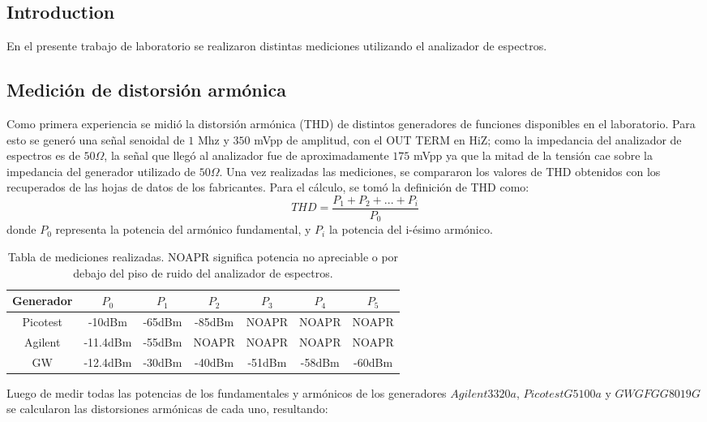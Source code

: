 \subsection{Introduction}

En el presente trabajo de laboratorio se realizaron distintas mediciones utilizando el analizador de espectros.

\subsection{Medición de distorsión armónica}
Como primera experiencia se midió la distorsión armónica (THD) de distintos generadores de funciones disponibles en el laboratorio. Para esto se generó una señal senoidal de $1$ Mhz y $350$ mVpp de amplitud, con el OUT TERM en HiZ; como la impedancia del analizador de espectros es de $50 \Omega$, la señal que llegó al analizador fue de aproximadamente $175$ mVpp ya que la mitad de la tensión cae sobre la impedancia del generador utilizado de $50 \Omega$. Una vez realizadas las mediciones, se compararon los valores de THD obtenidos con los recuperados de las hojas de datos de los fabricantes. Para el cálculo, se tomó la definición de THD como:
\begin{equation}
    THD=\frac{P_1+P_2+...+P_i}{P_0}
    \label{eq:THD}
\end{equation}
donde $P_0$ representa la potencia del armónico fundamental, y $P_i$ la potencia del i-ésimo armónico.

\begin{table}[H]
\centering
\begin{tabular}{@{}ccccccc@{}}
\toprule
\textbf{Generador} & $P_0$ & $P_1$ & $P_2$ & $P_3$ & $P_4$ & $P_5$ \\ \midrule
Picotest & -10dBm & -65dBm & -85dBm & NOAPR & NOAPR & NOAPR \\
Agilent & -11.4dBm & -55dBm & NOAPR & NOAPR & NOAPR & NOAPR \\
GW & -12.4dBm & -30dBm & -40dBm & -51dBm & -58dBm & -60dBm \\ \bottomrule
\end{tabular}
\caption{Tabla de mediciones realizadas. NOAPR significa potencia no apreciable o por debajo del piso de ruido del analizador de espectros.}
\end{table}

Luego de medir todas las potencias de los fundamentales y armónicos de los generadores $Agilent 3320a$, $Picotest G5100a$ y $GWGFG G8019G$ se calcularon las distorsiones armónicas de cada uno, resultando:

